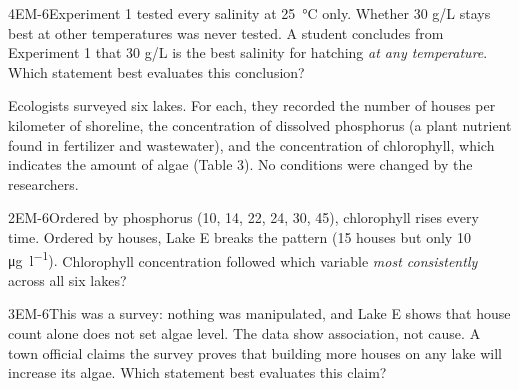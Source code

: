 \documentclass[11pt]{article}
\begin{document}
\begin{q}{4}{EM-6}{Experiment 1 tested every salinity at \SI{25}{\celsius} only. Whether 30 g/L stays best at other temperatures was never tested.}
A student concludes from Experiment 1 that 30 g/L is the best salinity for hatching \emph{at any temperature}. Which statement best evaluates this conclusion?
\end{q}

Ecologists surveyed six lakes. For each, they recorded the number of houses per kilometer of shoreline, the concentration of dissolved phosphorus (a plant nutrient found in fertilizer and wastewater), and the concentration of chlorophyll, which indicates the amount of algae (Table 3). No conditions were changed by the researchers.

\passageend

\begin{q}{2}{EM-6}{Ordered by phosphorus (10, 14, 22, 24, 30, 45), chlorophyll rises every time. Ordered by houses, Lake E breaks the pattern (15 houses but only 10 \si{\micro\gram\per\litre}).}
Chlorophyll concentration followed which variable \emph{most consistently} across all six lakes?
\end{q}

\begin{q}{3}{EM-6}{This was a survey: nothing was manipulated, and Lake E shows that house count alone does not set algae level. The data show association, not cause.}
A town official claims the survey proves that building more houses on any lake will increase its algae. Which statement best evaluates this claim?
\end{q}
\end{document}
